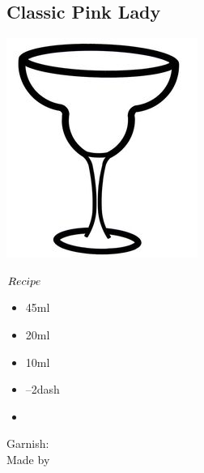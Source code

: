 \subsection{Classic Pink Lady}
\vspace{-7mm}
\hspace{49mm}
\includegraphics[scale=.05]{cocktail_glass_snow.jpg}
\vspace{2.5mm}
\begin{itembox}[l]{\boldmath $Recipe$}
\begin{itemize}
\setlength{\parskip}{0cm}
\setlength{\itemsep}{0cm}
\item \gin 45ml
\item \applejack 20ml
\item \lj 10ml
\item {}--2dash
\item {}
\end{itemize}
\vspace{-4mm}
Garnish: \cherry\\
Made by \shake
\end{itembox}


